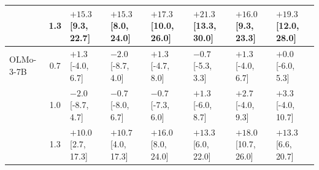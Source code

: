 \begin{tabular}{lcllllll}
 & 1.3 & $\mathbf{+15.3}$ [9.3, 22.7] & $\mathbf{+15.3}$ [8.0, 24.0] & $\mathbf{+17.3}$ [10.0, 26.0] & $\mathbf{+21.3}$ [13.3, 30.0] & $\mathbf{+16.0}$ [9.3, 23.3] & $\mathbf{+19.3}$ [12.0, 28.0] \\
\midrule
OLMo-3-7B & 0.7 & $+1.3$ [-4.0, 6.7] & $-2.0$ [-8.7, 4.0] & $+1.3$ [-4.7, 8.0] & $-0.7$ [-5.3, 3.3] & $+1.3$ [-4.0, 6.7] & $+0.0$ [-6.0, 5.3] \\
 & 1.0 & $-2.0$ [-8.7, 4.7] & $-0.7$ [-8.0, 6.7] & $-0.7$ [-7.3, 6.0] & $+1.3$ [-6.0, 8.7] & $+2.7$ [-4.0, 9.3] & $+3.3$ [-4.0, 10.7] \\
 & 1.3 & $\mathbf{+10.0}$ [2.7, 17.3] & $\mathbf{+10.7}$ [4.0, 17.3] & $\mathbf{+16.0}$ [8.0, 24.0] & $\mathbf{+13.3}$ [6.0, 22.0] & $\mathbf{+18.0}$ [10.7, 26.0] & $\mathbf{+13.3}$ [6.6, 20.7] \\
\bottomrule
\end{tabular}
